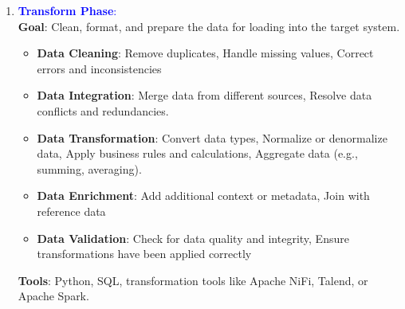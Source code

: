 \documentclass[letterpaper, 10.5pt,landscape]{article}
\begin{document}
\begin{multicols*}{3}
\begin{enumerate}[leftmargin=0.37cm]
    \item \textcolor{blue}{\textbf{Transform Phase}:} \\
    \textbf{Goal}: Clean, format, and prepare the data for loading into the target system.
    \vspace{-2pt}
    \begin{itemize}[leftmargin=0.35cm]
        \vspace{-3pt}
        \item \textbf{Data Cleaning}: Remove duplicates, Handle missing values, Correct errors and inconsistencies
        \vspace{-3pt}
        \item \textbf{Data Integration}: Merge data from different sources, Resolve data conflicts and redundancies.
        \vspace{-3pt}
        \item \textbf{Data Transformation}: Convert data types, Normalize or denormalize data, Apply business rules and calculations, Aggregate data (e.g., summing, averaging).
        \vspace{-3pt}
        \item \textbf{Data Enrichment}: Add additional context or metadata, Join with reference data
        \vspace{-3pt}
        \item \textbf{Data Validation}: Check for data quality and integrity, Ensure transformations have been applied correctly
    \end{itemize}
    \vspace{-3pt}
    \textbf{Tools}:  Python, SQL, transformation tools like Apache NiFi, Talend, or Apache Spark.



\end{enumerate}
\end{multicols*}
\end{document}
